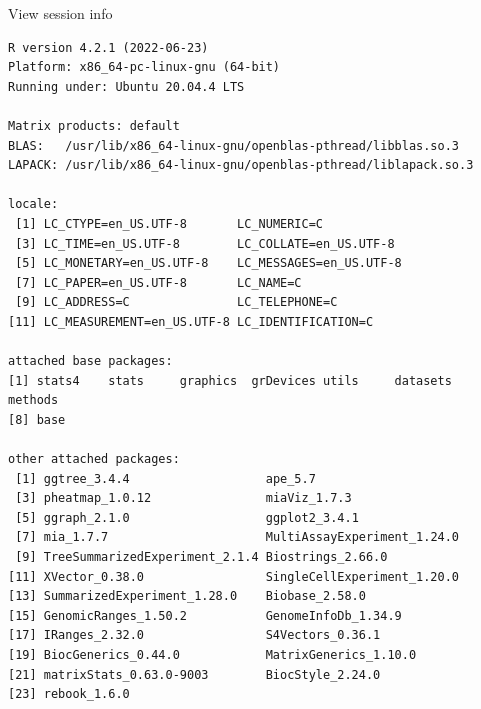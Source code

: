 \documentclass[
]{book}
\begin{document}
View session info

\begin{verbatim}
R version 4.2.1 (2022-06-23)
Platform: x86_64-pc-linux-gnu (64-bit)
Running under: Ubuntu 20.04.4 LTS

Matrix products: default
BLAS:   /usr/lib/x86_64-linux-gnu/openblas-pthread/libblas.so.3
LAPACK: /usr/lib/x86_64-linux-gnu/openblas-pthread/liblapack.so.3

locale:
 [1] LC_CTYPE=en_US.UTF-8       LC_NUMERIC=C              
 [3] LC_TIME=en_US.UTF-8        LC_COLLATE=en_US.UTF-8    
 [5] LC_MONETARY=en_US.UTF-8    LC_MESSAGES=en_US.UTF-8   
 [7] LC_PAPER=en_US.UTF-8       LC_NAME=C                 
 [9] LC_ADDRESS=C               LC_TELEPHONE=C            
[11] LC_MEASUREMENT=en_US.UTF-8 LC_IDENTIFICATION=C       

attached base packages:
[1] stats4    stats     graphics  grDevices utils     datasets  methods  
[8] base     

other attached packages:
 [1] ggtree_3.4.4                   ape_5.7                       
 [3] pheatmap_1.0.12                miaViz_1.7.3                  
 [5] ggraph_2.1.0                   ggplot2_3.4.1                 
 [7] mia_1.7.7                      MultiAssayExperiment_1.24.0   
 [9] TreeSummarizedExperiment_2.1.4 Biostrings_2.66.0             
[11] XVector_0.38.0                 SingleCellExperiment_1.20.0   
[13] SummarizedExperiment_1.28.0    Biobase_2.58.0                
[15] GenomicRanges_1.50.2           GenomeInfoDb_1.34.9           
[17] IRanges_2.32.0                 S4Vectors_0.36.1              
[19] BiocGenerics_0.44.0            MatrixGenerics_1.10.0         
[21] matrixStats_0.63.0-9003        BiocStyle_2.24.0              
[23] rebook_1.6.0                  


\end{verbatim}
\end{document}
